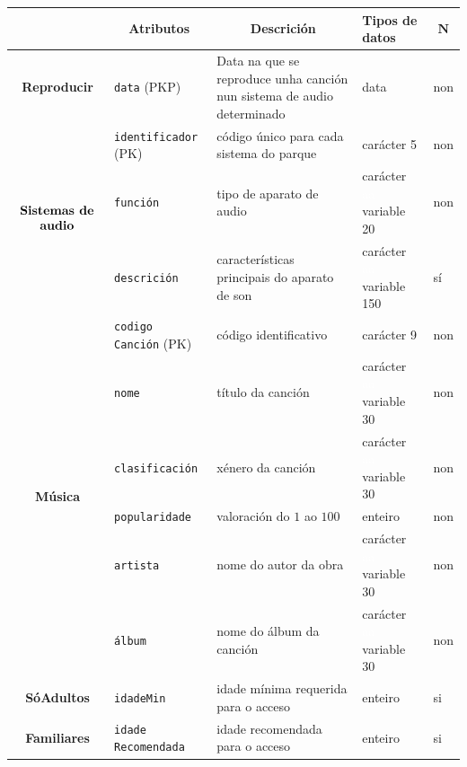 \documentclass[12pt,a4paper]{book}
\theoremstyle{definition}
\theoremstyle{break}
\begin{document}
	\newpage
	
	\begin{table} [H] \centering
		\begin{tabular}{|c|m{3cm}|m{4cm}|m{2cm}|m{0.7cm}|}
			\hline \rowcolor{gris}
			\multicolumn{1}{|m{2.5cm}|}{Entidade ou relación} & \multicolumn{1}{c|}{Atributos} & \multicolumn{1}{c|}{Descrición} & \multicolumn{1}{m{2cm}|}{Tipos de datos} & \multicolumn{1}{c|}{$\mathbf{N}$} \\
			\hline
			\textbf{Reproducir} & \texttt{data} (PKP) & Data na que se reproduce unha canción nun sistema de audio determinado & data & non\\
			\hline
			\multirow{3}{*}{$\begin{array}{c}
					\text{\textbf{Sistemas de}}\\\text{\textbf{audio}}
			\end{array}$} & \texttt{identificador} (PK) & código único para cada sistema do parque & carácter 5 & non\\
			\cline{2-5}
			&\texttt{función} & tipo de aparato de audio &  carácter \textcolor{white}{aa} variable 20 & non\\
			\cline{2-5}
			& \texttt{descrición} & características principais do aparato de son &  carácter \textcolor{white}{aa} variable 150 & sí\\
			\cline{2-5}
			\hline
			\multirow{6}{*}{\textbf{Música}} & \texttt{codigo Canción} (PK) & código identificativo & carácter 9 & non\\
			\cline{2-5}
			& \texttt{nome} & título da canción &  carácter \textcolor{white}{aa} variable 30 & non\\
			\cline{2-5}
			&\texttt{clasificación} & xénero da canción &  carácter \textcolor{white}{aa} variable 30 & non\\
			\cline{2-5}
			& \texttt{popularidade} & valoración do $1$ ao $100$ & enteiro & non\\
			\cline{2-5}
			& \texttt{artista} & nome do autor da obra &  carácter \textcolor{white}{aa} variable 30 & non\\
			\cline{2-5}
			& \texttt{álbum} & nome do álbum da canción &  carácter \textcolor{white}{aa} variable 30 & non\\
			\hline
			\textbf{SóAdultos} & \texttt{idadeMin} & idade mínima requerida para o acceso & enteiro & si\\
			\hline
			\textbf{Familiares} & \texttt{idade Recomendada } & idade recomendada para o acceso & enteiro & si\\
			\hline 
			
		\end{tabular}
	\end{table}
	
\end{document}

